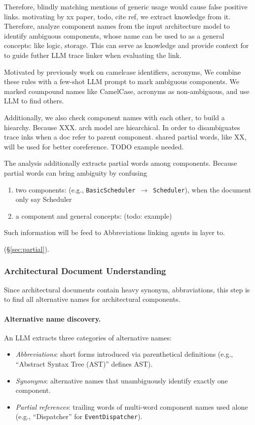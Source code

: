 Therefore, blindly matching mentions of generic usage would cause false positive links.
motivating by xx paper, todo, cite ref, we extract knowledge from it.
Therefore, analyze component names from the input architecture model to identify ambiguous components, whose name can be used to as a general concepts: like logic, storage.
This can serve as knowledge and provide context for to guide futher LLM trace linker when evaluating the link. 

Motivated by previously work on camelcase identifiers, acronyms, 
We combine these rules with a few-shot LLM prompt to mark ambiguous components.
We marked coumpound names like CamelCase, acronyms as non-ambiguous, and use LLM to find others.

Additionally, we also check component names with each other, to build a hiearchy.
Because XXX. arch model are hiearchical.
In order to disambiguates trace inks when a doc refer to parent component.
shared partial words, like XX, will be used for better coreference.
TODO example needed.


The analysis additionally extracts partial words among components. 
Because partial words can bring ambiguity by confusing 
\begin{enumerate}
  \item two components:  (e.g., \texttt{BasicScheduler}~$\to$~\texttt{Scheduler}), when the document only say Scheduler
  \item a component and general concepts: (todo: example)
\end{enumerate}
Such information will be feed to Abbreviations linking agents in layer to.

(\S\ref{sec:partial}).

\subsubsection{Architectural Document Understanding}
Since architectural documents contain heavy synonym, abbraviations, 
this step is to find all alternative names for architectural components. 
\paragraph{Alternative name discovery.}
An LLM extracts three categories of alternative names:
\begin{itemize}
    \item \emph{Abbreviations}: short forms introduced via parenthetical definitions (e.g., ``Abstract Syntax Tree (AST)'' defines AST).
    \item \emph{Synonyms}: alternative names that unambiguously identify exactly one component. 
    \item \emph{Partial references}: trailing words of multi-word component names used alone (e.g., ``Dispatcher'' for \texttt{EventDispatcher}).
\end{itemize}

